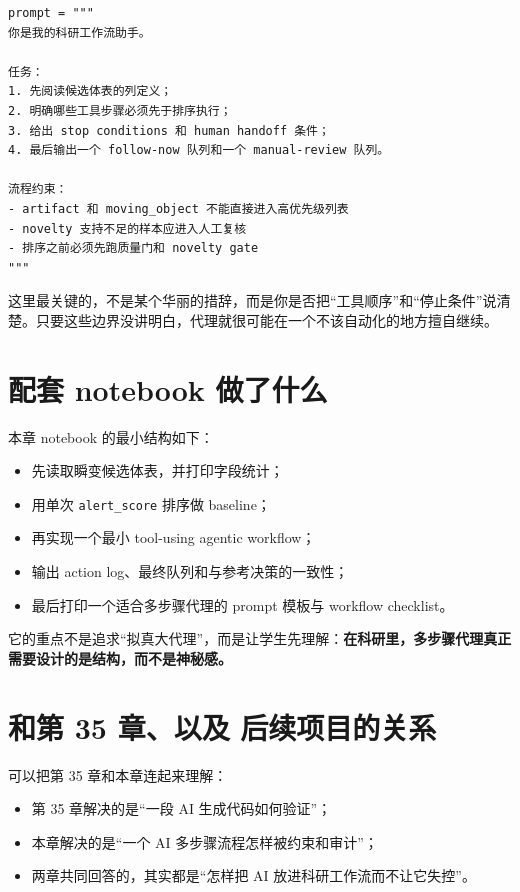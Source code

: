 \begin{examplebox}
\begin{lstlisting}[style=pythonstyle]
prompt = """
你是我的科研工作流助手。

任务：
1. 先阅读候选体表的列定义；
2. 明确哪些工具步骤必须先于排序执行；
3. 给出 stop conditions 和 human handoff 条件；
4. 最后输出一个 follow-now 队列和一个 manual-review 队列。

流程约束：
- artifact 和 moving_object 不能直接进入高优先级列表
- novelty 支持不足的样本应进入人工复核
- 排序之前必须先跑质量门和 novelty gate
"""
\end{lstlisting}
\end{examplebox}

这里最关键的，不是某个华丽的措辞，而是你是否把“工具顺序”和“停止条件”说清楚。只要这些边界没讲明白，代理就很可能在一个不该自动化的地方擅自继续。

\section{配套 notebook 做了什么}

本章 notebook 的最小结构如下：

\begin{itemize}
    \item 先读取瞬变候选体表，并打印字段统计；
    \item 用单次 \texttt{alert\_score} 排序做 baseline；
    \item 再实现一个最小 tool-using agentic workflow；
    \item 输出 action log、最终队列和与参考决策的一致性；
    \item 最后打印一个适合多步骤代理的 prompt 模板与 workflow checklist。
\end{itemize}

它的重点不是追求“拟真大代理”，而是让学生先理解：\textbf{在科研里，多步骤代理真正需要设计的是结构，而不是神秘感。}

\section{和第 35 章、以及 后续项目的关系}

可以把第 35 章和本章连起来理解：

\begin{itemize}
    \item 第 35 章解决的是“一段 AI 生成代码如何验证”；
    \item 本章解决的是“一个 AI 多步骤流程怎样被约束和审计”；
    \item 两章共同回答的，其实都是“怎样把 AI 放进科研工作流而不让它失控”。
\end{itemize}

